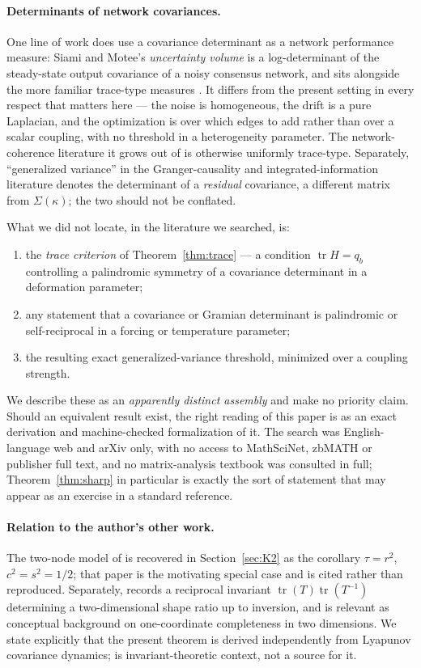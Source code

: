 \documentclass[11pt]{article}
\theoremstyle{plain}
\theoremstyle{definition}
\theoremstyle{remark}
\newcommand{\tr}{\operatorname{tr}}
\newcommand{\Sig}{\Sigma}
\begin{document}
\paragraph{Determinants of network covariances.} One line of work does use a covariance
determinant as a network performance measure: Siami and Motee's \emph{uncertainty volume} is a
log-determinant of the steady-state output covariance of a noisy consensus network, and sits
alongside the more familiar trace-type measures \cite{SiamiMotee2018}. It differs from the
present setting in every respect that matters here --- the noise is homogeneous, the drift is a
pure Laplacian, and the optimization is over which edges to add rather than over a scalar
coupling, with no threshold in a heterogeneity parameter. The network-coherence literature it
grows out of \cite{BamiehEtAl2012} is otherwise uniformly trace-type. Separately, ``generalized
variance'' in the Granger-causality and integrated-information literature
\cite{BarrettSeth2011} denotes the determinant of a \emph{residual} covariance, a different
matrix from $\Sig(\kappa)$; the two should not be conflated.

What we did not locate, in the literature we searched, is:
\begin{enumerate}\itemsep2pt
\item the \emph{trace criterion} of Theorem~\ref{thm:trace} --- a condition $\tr H=q_b$
  controlling a palindromic symmetry of a covariance determinant in a deformation parameter;
\item any statement that a covariance or Gramian determinant is palindromic or self-reciprocal
  in a forcing or temperature parameter;
\item the resulting exact generalized-variance threshold, minimized over a coupling strength.
\end{enumerate}
We describe these as an \emph{apparently distinct assembly} and make no priority claim. Should
an equivalent result exist, the right reading of this paper is as an exact derivation and
machine-checked formalization of it. The search was English-language web and arXiv only, with no
access to MathSciNet, zbMATH or publisher full text, and no matrix-analysis textbook was
consulted in full; Theorem~\ref{thm:sharp} in particular is exactly the sort of statement that
may appear as an exercise in a standard reference.

\paragraph{Relation to the author's other work.} The two-node model of \cite{DeJesus2026ou} is
recovered in Section~\ref{sec:K2} as the corollary $\tau=r^2$, $c^2=s^2=1/2$; that paper is the
motivating special case and is cited rather than reproduced. Separately, \cite{DeJesus2026dual}
records a reciprocal invariant $\tr(T)\tr(T^{-1})$ determining a two-dimensional shape ratio up
to inversion, and is relevant as conceptual background on one-coordinate completeness in two
dimensions. We state explicitly that the present theorem is derived independently from Lyapunov
covariance dynamics; \cite{DeJesus2026dual} is invariant-theoretic context, not a source for it.
\end{document}
